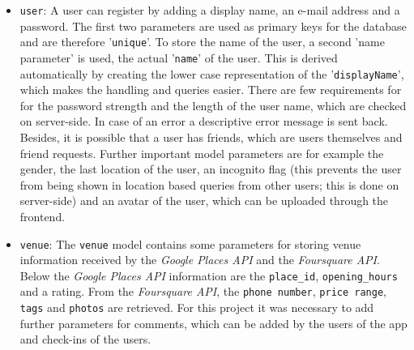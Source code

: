 \begin{itemize}
	\item \texttt{user}: A user can register by adding a display name, an e-mail address and a password. The first two parameters are used as primary keys for the database and are therefore '\texttt{unique}'. To store the name of the user, a second 'name parameter' is used, the actual '\texttt{name}' of the user. This is derived automatically by creating the lower case representation of the '\texttt{displayName}', which makes the handling and queries easier. There are few requirements for for the password strength and the length of the user name, which are checked on server-side. In case of an error a descriptive error message is sent back. \newline Besides, it is possible that a user has friends, which are users themselves and friend requests. Further important model parameters are for example the gender, the last location of the user, an incognito flag (this prevents the user from being shown in location based queries from other users; this is done on server-side) and an avatar of the user, which can be uploaded through the frontend.
	\item \texttt{venue}: The \texttt{venue} model contains some parameters for storing venue information received by the \textit{Google Places API} and the \textit{Foursquare API}. Below the \textit{Google Places API} information are the \texttt{place\_id}, \texttt{opening\_hours} and a rating. From the \textit{Foursquare API}, the \texttt{phone number}, \texttt{price range}, \texttt{tags} and \texttt{photos} are retrieved. For this project it was necessary to add further parameters for comments, which can be added by the users of the app and check-ins of the users. 
\end{itemize}

